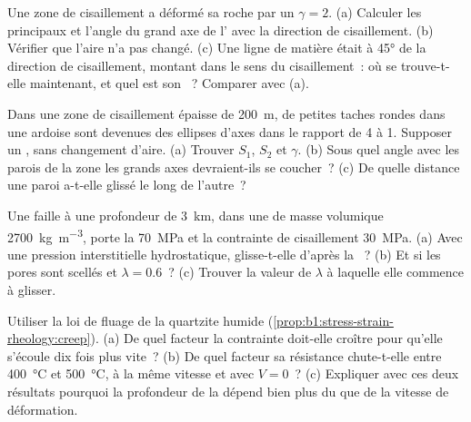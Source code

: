 \begin{exercise}[$\star\star$]\label{exo:b1:stress-strain-rheology:6}
Une zone de cisaillement a déformé sa roche par un  $\gamma = 2$. (a) Calculer
les  principaux et l'angle du grand axe de l'
avec la direction de cisaillement. (b) Vérifier que l'aire n'a pas changé. (c) Une ligne de
matière était à \ang{45} de la direction de cisaillement, montant dans le sens du
cisaillement~: où se trouve-t-elle maintenant, et quel est son ~? Comparer avec (a).
\end{exercise}

\begin{exercise}[$\star\star$]\label{exo:b1:stress-strain-rheology:7}
Dans une zone de cisaillement épaisse de \qty{200}{m}, de petites taches rondes dans une ardoise sont devenues des
ellipses d'axes dans le rapport de 4 à 1. Supposer un , sans changement
d'aire. (a) Trouver $S_1$, $S_2$ et $\gamma$. (b) Sous quel angle avec les parois de
la zone les grands axes devraient-ils se coucher~? (c) De quelle distance une paroi a-t-elle glissé le long de
l'autre~?
\end{exercise}

\begin{exercise}[$\star\star$]\label{exo:b1:stress-strain-rheology:8}
Une faille à une profondeur de \qty{3}{km}, dans une  de masse volumique \qty{2700}{kg.m^{-3}},
porte la  \qty{70}{MPa} et la contrainte de cisaillement \qty{30}{MPa}.
(a) Avec une pression interstitielle hydrostatique, glisse-t-elle d'après la ~?
(b) Et si les pores sont scellés et $\lambda = 0.6$~? (c) Trouver la valeur
de $\lambda$ à laquelle elle commence à glisser.
\end{exercise}

\begin{exercise}[$\star\star$]\label{exo:b1:stress-strain-rheology:9}
Utiliser la loi de fluage de la quartzite humide (\cref{prop:b1:stress-strain-rheology:creep}).
(a) De quel facteur la contrainte doit-elle croître pour qu'elle s'écoule dix fois plus vite~?
(b) De quel facteur sa résistance chute-t-elle entre \qty{400}{\degreeCelsius}
et \qty{500}{\degreeCelsius}, à la même vitesse et avec $V = 0$~? (c) Expliquer
avec ces deux résultats pourquoi la profondeur de la 
dépend bien plus du  que de la vitesse de déformation.
\end{exercise}


